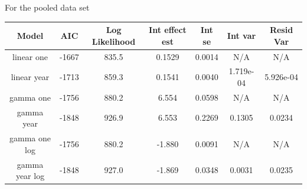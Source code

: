 \documentclass[12pt, letterpaper, titlepage]{article}
\begin{document}
For the pooled data set
\begin{center}
  \begin{tabular}{|c  c  c  c  c  c  c |}
   \hline 
   Model & AIC & Log Likelihood & Int effect est & Int se & Int var & Resid Var \\ [0.5ex] 
   \hline\hline
   linear one & -1667 & 835.5 & 0.1529 & 0.0014 & N/A & N/A \\
   \hline
   linear year & -1713 & 859.3 & 0.1541 & 0.0040 & 1.719e-04 & 5.926e-04 \\ 
   \hline
   gamma one & -1756 & 880.2 & 6.554 & 0.0598 & N/A & N/A \\
   \hline
   gamma year & -1848 & 926.9 & 6.553 & 0.2269 & 0.1305 & 0.0234 \\
   \hline
   gamma one log & -1756 & 880.2 & -1.880 & 0.0091 & N/A & N/A \\
   \hline
   gamma year log & -1848 & 927.0 & -1.869 & 0.0348 & 0.0031 & 0.0235 \\ [0.5ex]
   \hline
  \end{tabular}
  \end{center}



\end{document}
